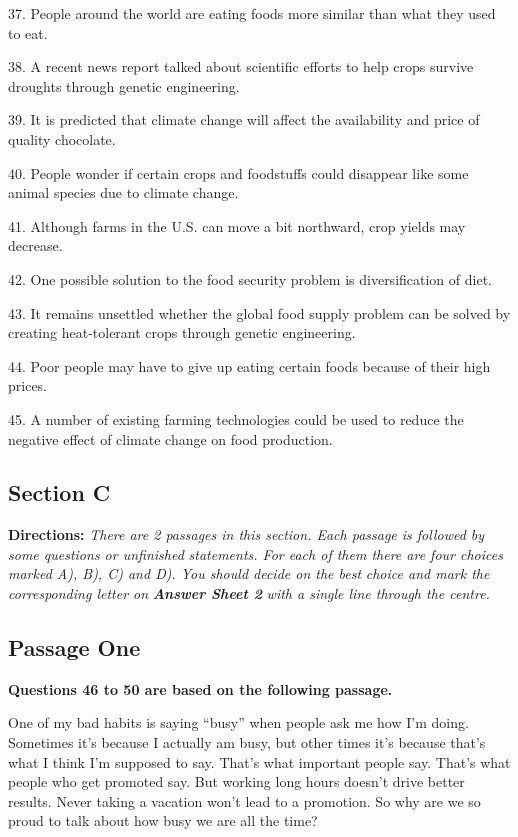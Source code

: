 \documentclass[UTF8,11pt]{ctexart}
\begin{document}
37. People around the world are eating foods more similar than what they used to eat.


38. A recent news report talked about scientific efforts to help crops survive droughts through genetic engineering.


39. It is predicted that climate change will affect the availability and price of quality chocolate.


40. People wonder if certain crops and foodstuffs could disappear like some animal species due to climate change.


41. Although farms in the U.S. can move a bit northward, crop yields may decrease.


42. One possible solution to the food security problem is diversification of diet.


43. It remains unsettled whether the global food supply problem can be solved by creating heat-tolerant crops through genetic engineering.


44. Poor people may have to give up eating certain foods because of their high prices.


45. A number of existing farming technologies could be used to reduce the negative effect of climate change on food production.


\subsection*{\textbf{Section C}}


\textbf{Directions: }\textit{There are 2 passages in this section. Each passage is followed by some questions or unfinished} \textit{statements. For each of them there are four choices marked A), B), C) and D). You should decide on the best} \textit{choice and mark the corresponding letter on }\textbf{\textit{Answer Sheet 2}}\textit{ with a single line through the centre.}


\subsection*{\textbf{Passage One}}


\textbf{Questions 46 to 50 are based on the following passage.}


One of my bad habits is saying “busy” when people ask me how I’m doing. Sometimes it’s because I actually am busy, but other times it’s because that’s what I think I’m supposed to say. That’s what important people say. That’s what people who get promoted say. But working long hours doesn’t drive better results. Never taking a vacation won’t lead to a promotion. So why are we so proud to talk about how busy we are all the time?
\end{document}
